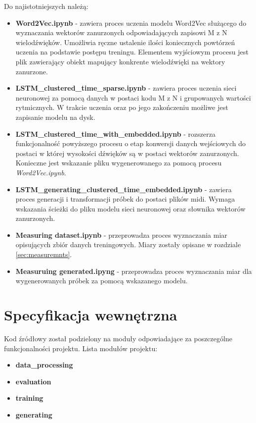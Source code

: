 {{        Do najistotniejszych należą:
        \begin{itemize}
            \setlength\itemsep{-0.5em}
            \item {\textbf {{Word2Vec.ipynb}}} - zawiera proces uczenia modelu Word2Vec służącego do wyznaczania wektorów zanurzonych odpowiadających zapisowi M\,\,z\,\,N wielodźwięków. Umożliwia ręczne ustalenie ilości koniecznych powtórzeń uczenia na podstawie postępu treningu. Elementem wyjściowym procesu jest plik zawierający obiekt mapujący konkrente wielodźwięki na wektory zanurzone.
            \item {\textbf {{LSTM\_clustered\_time\_sparse.ipynb}}} - zawiera proces uczenia sieci neuronowej za pomocą danych w postaci kodu M\,\,z\,\,N i grupowanych wartości rytmicznych. W trakcie uczenia oraz po jego zakończeniu możliwe jest zapisanie modelu na dysk.
            \item {\textbf {{LSTM\_clustered\_time\_with\_embedded.ipynb}}} - rozszerza funkcjonalność powyższego procesu o etap konwersji danych wejściowych do postaci w której wysokości dźwięków są w postaci wektorów zanurzonych. Konieczne jest wskazanie pliku wygenerowanego za pomocą procesu {\textit {{Word2Vec.ipynb}}}.
            \item {\textbf {LSTM\_generating\_clustered\_time\_embedded.ipynb}} - zawiera proces generacji i transformacji próbek do postaci plików midi. Wymaga wskazania ścieżki do pliku modelu sieci neuronowej oraz słownika wektorów zanurzonych.
            \item {\textbf {{Measuring dataset.ipynb}}} - przeprowadza proces wyznaczania miar opisujących zbiór danych treningowych. Miary zostały opisane w rozdziale \ref{sec:measuremnts}.
            \item {\textbf {{Measuruing generated.ipyng}}} - przeprowadza proces wyznaczania miar dla wygenerowanych próbek za pomocą wskazanego modelu. 
        \end{itemize}
    }

    \section{Specyfikacja wewnętrzna}
    {
        Kod źródłowy został podzielony na moduły odpowiadające za poszczególne funkcjonalności projektu. Lista modułów projektu:

        \begin{itemize}
            \setlength\itemsep{-0.5em}
            \item {\textbf {data\_processing}} 
            \item {\textbf {evaluation}}
            \item {\textbf {training}}
            \item {\textbf {generating}}
        \end{itemize}

}}
